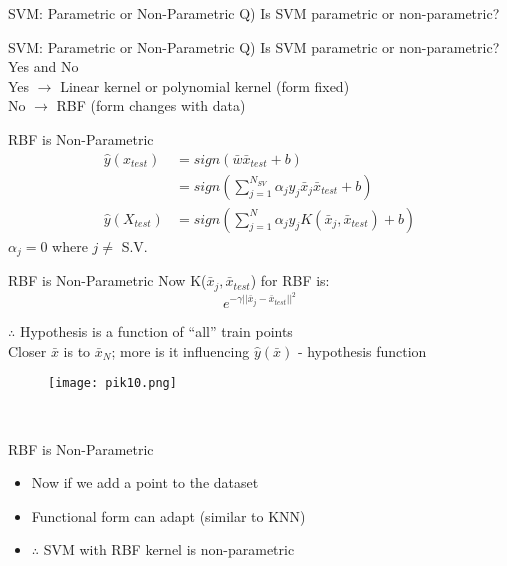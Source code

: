 \documentclass{beamer}
\begin{document}
	\begin{frame}{SVM: Parametric or Non-Parametric}
	    Q) Is SVM parametric or non-parametric? \\
	\end{frame}
	\begin{frame}{SVM: Parametric or Non-Parametric}
	    Q) Is SVM parametric or non-parametric? \\
	    \hspace{0.5cm} Yes and No \\
	    \hspace{0.5cm} Yes $\rightarrow$ Linear kernel or polynomial kernel (form fixed)\\
	    \hspace{0.5cm} No $\rightarrow$ RBF (form changes with data)
	\end{frame}
	\begin{frame}{RBF is Non-Parametric}
	    \begin{align*}
	        \hat{y}(x_{test}) &= sign(\bar{w}\bar{x}_{test} + b) \\
	        &= sign(\sum_{j=1}^{N_{SV}}\alpha_{j}y_{j}\bar{x}_{j}\bar{x}_{test} + b)\\
	        \hat{y}(X_{test}) &= sign(\sum_{j=1}^{N}\alpha_{j}y_{j} K(\bar{x}_{j}, \bar{x}_{test}) + b)
	    \end{align*}
	    $\alpha_{j} = 0$ where $j \neq$ S.V.
	\end{frame}
	\begin{frame}{RBF is Non-Parametric}
	    Now K($\bar{x}_{j}, \bar{x}_{test}$) for RBF is:
	    $$e^{-\gamma \lvert\lvert\bar{x}_{j} - \bar{x}_{test}\rvert\rvert^{2}}$$
	    
	    $\therefore$ Hypothesis is a function of ``all'' train points \\
	    Closer $\bar{x}$ is to $\bar{x}_{N}$; more is it influencing $\hat{y}(\bar{x})$ - hypothesis function
	    \vspace{-4cm}
	    \begin{minipage}{0.2\textwidth}
    \vspace{-2cm}
      \begin{figure}
      
       \texttt{[image: pik10.png]}
      \end{figure}
  \end{minipage} \\
	\end{frame}
	\begin{frame}{RBF is Non-Parametric}
		\begin{itemize}[<+->]
			\item Now if we add a point to the dataset 
			\item Functional form can adapt (similar to KNN) 
			\item $\therefore$ SVM with RBF kernel is non-parametric
		\end{itemize}
	\end{frame}
\end{document}
